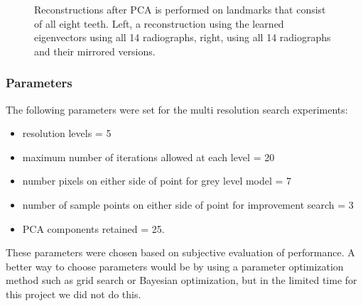 \documentclass[a4paper]{article}
\begin{document}
\begin{figure}[!tbp]
  \centering
  \begin{adjustbox}{center}
  \end{adjustbox}
  \caption{Reconstructions after PCA is performed on landmarks that consist of all eight teeth. Left, a reconstruction using the learned eigenvectors using all 14 radiographs, right, using all 14 radiographs and their mirrored versions.}
  \label{fig:pca}
\end{figure}

\newpage
\subsubsection{Parameters}
The following parameters were set for the multi resolution search experiments: 
\begin{itemize}
\item resolution levels = 5
\item maximum number of iterations allowed at each level = 20
\item number pixels on either side of point for grey level model = 7
\item number of sample points on either side of point for improvement search = 3
\item PCA components retained = 25. 
\end{itemize}
These parameters were chosen based on subjective evaluation of performance. A better way to choose parameters would be by using a parameter optimization method such as grid search or Bayesian optimization, but in the limited time for this project we did not do this.
\end{document}
